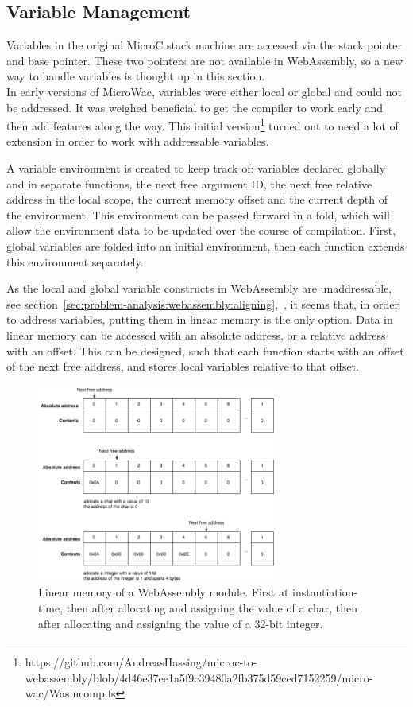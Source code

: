 \documentclass[a4paper]{article}
\begin{document}
\subsection{Variable Management}
\label{sec:technical:variables}
Variables in the original MicroC stack machine are accessed via the stack pointer and base pointer. These two pointers are not available in WebAssembly, so a new way to handle variables is thought up in this section.\\

\noindent In early versions of MicroWac, variables were either local or global and could not be addressed. It was weighed beneficial to get the compiler to work early and then add features along the way. This initial version\footnote{https://github.com/AndreasHassing/microc-to-webassembly/blob/4d46e37ee1a5f9c39480a2fb375d59ced7152259/micro-wac/Wasmcomp.fs} turned out to need a lot of extension in order to work with addressable variables.

A variable environment is created to keep track of: variables declared globally and in separate functions, the next free argument ID, the next free relative address in the local scope, the current memory offset and the current depth of the environment. This environment can be passed forward in a fold, which will allow the environment data to be updated over the course of compilation. First, global variables are folded into an initial environment, then each function extends this environment separately.

As the local and global variable constructs in WebAssembly are unaddressable, see section~\ref{sec:problem-analysis:webassembly:aligning},~, it seems that, in order to address variables, putting them in linear memory is the only option. Data in linear memory can be accessed with an absolute address, or a relative address with an offset. This can be designed, such that each function starts with an offset of the next free address, and stores local variables relative to that offset.

\begin{figure}[H]
	\includegraphics[width=0.7\textwidth]{MemoryManagement}
	\centering
	\caption{Linear memory of a WebAssembly module. First at instantiation-time, then after allocating and assigning the value of a char, then after allocating and assigning the value of a 32-bit integer.}
	\label{fig:memory-management}
\end{figure}
\end{document}
